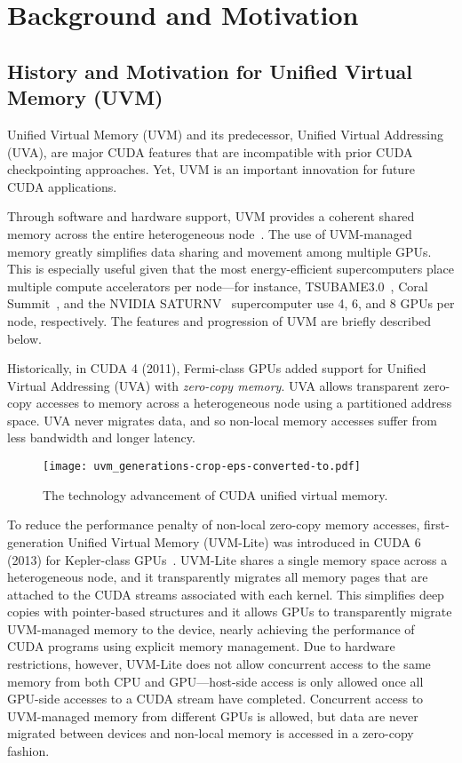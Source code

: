 \documentclass[11pt]{article}
\begin{document}
\section{Background and Motivation}
\label{sec:motivation}


\subsection{History and Motivation for Unified Virtual Memory (UVM)}


Unified Virtual Memory (UVM) and its predecessor, Unified Virtual Addressing
(UVA), are major CUDA features that are incompatible with prior CUDA
checkpointing approaches. Yet, UVM is an important innovation for
future CUDA applications.

Through software and hardware support, UVM provides a
coherent shared memory across the entire heterogeneous
node~\cite{cuda_programming_2017,harris_2017}.  The use of UVM-managed memory
greatly simplifies data sharing and movement among multiple GPUs. This is
especially useful given that the most energy-efficient supercomputers place
multiple compute accelerators per node---for instance,
TSUBAME3.0~\cite{tiffany_trader_tsubame3.0}, Coral Summit~\cite{coral_summit},
and the NVIDIA SATURNV~\cite{roy_kim_nvidia_2016} supercomputer use 4, 6, and 8
GPUs per node, respectively. The features and progression of UVM are briefly
described below.


Historically, in CUDA 4 (2011), Fermi-class GPUs added support for Unified
Virtual Addressing
(UVA) with {\em zero-copy memory}.  UVA allows transparent zero-copy
accesses to memory across a
heterogeneous node using a partitioned address space. UVA never migrates data,
and so non-local memory accesses suffer from less bandwidth and longer latency.

\begin{figure}[t!]
\centering
\texttt{[image: uvm\_generations-crop-eps-converted-to.pdf]}
\caption{The technology advancement of CUDA unified virtual memory\@.}
\label{fig:uvm_generations}
  \vspace{-0.5cm}
\end{figure}

To reduce the performance penalty of non-local zero-copy memory accesses,
first-generation Unified Virtual Memory (UVM-Lite) was introduced in CUDA 6
(2013) for Kepler-class GPUs~\cite{harris_2013}. UVM-Lite shares a single
memory space across a heterogeneous node, and it transparently migrates all
memory pages that are attached to the CUDA streams associated with each kernel.
This simplifies deep copies with pointer-based structures and it allows GPUs to
transparently migrate UVM-managed memory to the device, nearly achieving the
performance of CUDA programs using explicit memory management. Due to hardware
restrictions, however, UVM-Lite does not allow concurrent access to the same
memory from both CPU and GPU---host-side access is only allowed once all
GPU-side accesses to a CUDA stream have completed. Concurrent access to
UVM-managed memory from different GPUs is allowed, but data are never migrated
between devices and non-local memory is accessed in a zero-copy fashion.
\end{document}
